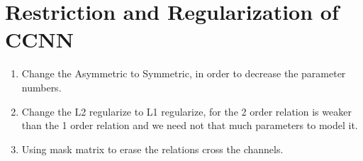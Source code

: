 \documentclass[12pt]{article}
\begin{document}
\section{Restriction and Regularization of CCNN}
\begin{enumerate}
    \item Change the Asymmetric to Symmetric, in order to decrease the parameter numbers.
    \item Change the L2 regularize to L1 regularize, for the 2 order relation is weaker than the 1 order relation and we need not that much parameters to model it.
    \item Using mask matrix to erase the relations cross the channels.
\end{enumerate}
\end{document}

